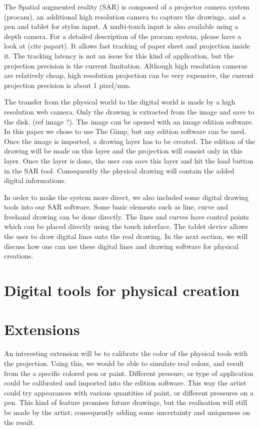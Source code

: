 \documentclass{article}
\begin{document}
The Spatial augmented reality (SAR) is composed of a projector camera system (procam), an additional high resolution camera to capture the drawings, and a pen and tablet for stylus input. A multi-touch input is also available using a depth camera. For a detailed description of the procam system, please have a look at (cite papart). It allows fast tracking of paper sheet and projection inside it. The tracking latency is not an issue for this kind of application, but the projection precision is the current limitation. Although high resolution cameras are relatively cheap, high resolution projection can be very expensive, the current projection precision is about 1 pixel/mm. 

The transfer from the physical world to the digital world is made by a high resolution web camera. Only the drawing is extracted from the image and save to the disk. (ref image ?). The image can be opened with an image edition software. In this paper we chose to use The Gimp, but any edition software can be used. Once the image is imported, a drawing layer has to be created. The edition of the drawing will be made on this layer and the projection will consist only in this layer. Once the  layer is done, the user can save this layer and hit the load button in the SAR tool. Consequently the physical drawing will contain the added digital informations.  

In order to make the system more direct, we also included some digital drawing tools into our SAR software. Some basic elements such as line, curve and freehand drawing can be done directly. The lines and curves have control points which can be placed directly using the touch interface. The tablet device allows the user to draw digital lines onto the real drawing. In the next section, we will discuss how one can use these digital lines and drawing software for physical creations. 


\section{Digital tools for physical creation}



\section{Extensions}

An interesting extension will be to calibrate the color of the physical tools with the projection. Using this, we would be able to simulate real colors, and result from the a specific colored pen or paint. Different pressure, or type of application could be calibrated and imported into the edition software. This way the artist could try appearances with various quantities of paint, or different pressures on a pen. This kind of feature promises future drawings, but the realisation will still be made by the artist; consequently adding some uncertainty and uniqueness on the result. 
\end{document}

